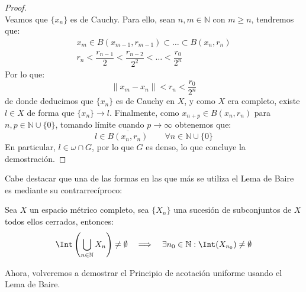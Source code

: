 \begin{lema}[de Baire]
\begin{proof}
\begin{equation*}
        \end{equation*}
        Veamos que $\{x_n\}$ es de Cauchy. Para ello, sean $n,m\in \mathbb{N}$ con $m\geq n$, tendremos que:
        \begin{gather*}
            x_m \in B(x_{m-1},r_{m-1}) \subset \ldots \subset B(x_n,r_n) \\
            r_n < \dfrac{r_{n-1}}{2} < \dfrac{r_{n-2}}{2^2} < \ldots < \dfrac{r_0}{2^n}
        \end{gather*}
        Por lo que:
        \begin{equation*}
            \|x_m - x_n\| < r_n < \dfrac{r_0}{2^n}
        \end{equation*}
        de donde deducimos que $\{x_n\}$ es de Cauchy en $X$, y como $X$ era completo, existe $l\in X$ de forma que $\{x_n\}\to l$. Finalmente, como $x_{n+p}\in B(x_n,r_n)$ para $n,p\in \mathbb{N}\cup\{0\}$, tomando límite cuando $p\to \infty$ obtenemos que:
        \begin{equation*}
            l \in \overline{B(x_n,r_n)} \qquad \forall n\in \mathbb{N}\cup \{0\}
        \end{equation*}
        En particular, $l\in \omega \cap G$, por lo que $G$ es denso, lo que concluye la demostración.
    \end{proof}
\end{lema}

\noindent
Cabe destacar que una de las formas en las que más se utiliza el Lema de Baire es mediante su contrarrecíproco:
\begin{center}
    Sea $X$ un espacio métrico completo, sea $\{X_n\}$ una sucesión de subconjuntos de $X$ todos ellos cerrados, entonces:
    \begin{equation*}
        \Int\left(\bigcup_{n\in \mathbb{N}}X_n\right) \neq \emptyset \quad  \Longrightarrow \quad  \exists n_0\in \mathbb{N} : \Int(X_{n_0}) \neq \emptyset 
    \end{equation*}
\end{center}

\noindent
Ahora, volveremos a demostrar el Principio de acotación uniforme usando el Lema de Baire.

